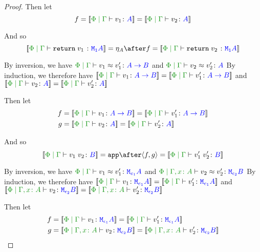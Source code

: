 \documentclass{report}
\begin{document}
\begin{framed}
\begin{proof}
        Then let
        \begin{equation}
            f = \deno{\gpetyperelation{v_1}{A}} = \deno{\gpetyperelation{v_2}{A}}
        \end{equation}
        
        And so
        \begin{equation}
            \deno{\gpetyperelation{\return{v_1}}{\M{\1}{A}}} = \point{A}\after f = \deno{\gpetyperelation{\return{v_2}}{\M{\1}{A}}}
        \end{equation}
        
        
        \case{\eqapply}
        By inversion, we have $\gpeberelation{v_1}{v_1'}{\ab}$ and $\gpeberelation{v_2}{v_2'}{A}$
        By induction, we therefore have $\deno{\gpetyperelation{v_1}{\ab}}= \deno{\gpetyperelation{v_1'}{\ab}}$ and $\deno{\gpetyperelation{v_2}{A}} = \deno{\gpetyperelation{v_2'}{A}}$
        
        Then let
        \begin{align*}
            f &{}= \deno{\gpetyperelation{v_1}{\ab}} = \deno{\gpetyperelation{v_1'}{\ab}}\\
            g &{}= \deno{\gpetyperelation{v_2}{A}} = \deno{\gpetyperelation{v_2'}{A}}
        \end{align*}
        
        
        
        And so
        \begin{equation}
            \deno{\gpetyperelation{\apply{v_1}{v_2}}{B}} = \app\after\pr{f}{g} = \deno{\gpetyperelation{\apply{v_1'}{v_2'}}{B}}
        \end{equation}
        
        
        \case{\eqbind}
        By inversion, we have $\gpeberelation{v_1}{v_1'}{\M{e_1}{A}}$ and $\eberelation{\P}{\gax}{v_2}{v_2'}{\M{\e_2}{B}}$
        By induction, we therefore have $\deno{\gpetyperelation{v_1}{\M{e_1}{A}}}= \deno{\gpetyperelation{v_1'}{\M{e_1}{A}}}$ and $\deno{\etyperelation{\P}{\gax}{v_2}{\M{\e_2}{B}}} = \deno{\etyperelation{\P}{\gax}{v_2'}{\M{\e_2}{B}}}$
        
        Then let
        \begin{align*}
            f &{}=\deno{\gpetyperelation{v_1}{\M{\e_1}{A}}}= \deno{\gpetyperelation{v_1'}{\M{\e_1}{A}}}\\
            g &{}=\deno{\etyperelation{\P}{\gax}{v_2}{\M{\e_2}{B}}} = \deno{\etyperelation{\P}{\gax}{v_2'}{\M{\e_2}{B}}}
        \end{align*}
        

\end{proof}
\end{framed}
\end{document}
